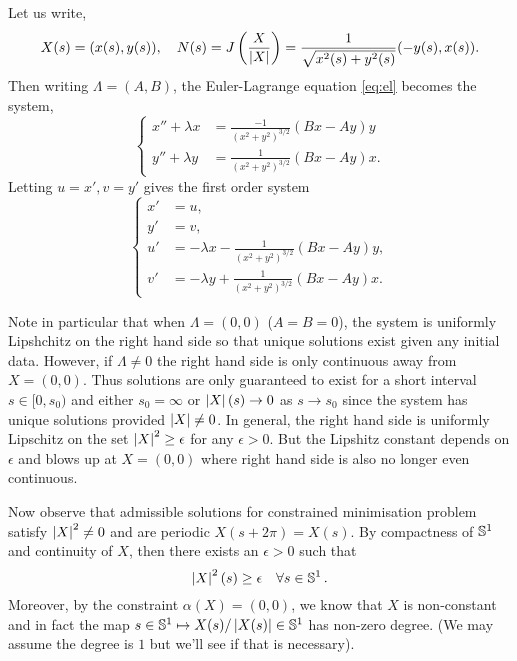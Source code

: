\documentclass[12pt]{article}
\begin{document}
Let us write,
\[
X(s) = (x(s), y(s)), \quad N(s) = J\left(\frac{X}{\left|{X}\right|}\right) = \frac{1}{\sqrt{x^2(s) + y^2(s)}} (-y(s), x(s)).
\]
Then writing \(\Lambda = (A, B)\), the Euler-Lagrange equation \eqref{eq:el} becomes the system,
\[
\begin{cases}
x'' + \lambda x &= \frac{-1}{(x^2 + y^2)^{3/2}} (Bx - Ay) y \\
y'' + \lambda y &= \frac{1}{(x^2 + y^2)^{3/2}} (Bx- Ay) x.
\end{cases}
\]
Letting \(u = x', v = y'\) gives the first order system
\begin{equation}
\label{eq:ode}
\begin{cases}
x' &= u, \\
y' &= v, \\
u' &= -\lambda x - \frac{1}{(x^2 + y^2)^{3/2}} (Bx - Ay) y, \\
v' &= -\lambda y + \frac{1}{(x^2 + y^2)^{3/2}} (Bx - Ay) x.
\end{cases}
\end{equation}

Note in particular that when \(\Lambda = (0, 0)\) (\(A = B = 0\)), the system is uniformly Lipshchitz on the right hand side so that unique solutions exist given any initial data. However, if \(\Lambda \ne 0\) the right hand side is only continuous away from \(X = (0, 0)\). Thus solutions are only guaranteed to exist for a short interval \(s \in [0, s_0)\) and either \(s_0 = \infty\) or \(\left|{X}\right|(s) \to 0\) as \(s \to s_0\) since the system has unique solutions provided \(\left|{X}\right| \ne 0\). In general, the right hand side is uniformly Lipschitz on the set \(\left|{X}\right|^2 \geq \epsilon\) for any \(\epsilon > 0\). But the Lipshitz constant depends on \(\epsilon\) and blows up at \(X = (0, 0)\) where right hand side is also no longer even continuous.

Now observe that admissible solutions for constrained minimisation problem satisfy \(\left|{X}\right|^2 \ne 0\) and are periodic \(X(s + 2\pi) = X(s)\). By compactness of \(\operatorname{\mathbb{S}^1}\) and continuity of \(X\), then there exists an \(\epsilon > 0\) such that
\begin{equation}
\label{eq:non_degen}
\left|{X}\right|^2(s) \geq \epsilon \quad \forall s \in \operatorname{\mathbb{S}^1}.
\end{equation}
Moreover, by the constraint \(\alpha(X) = (0, 0)\), we know that \(X\) is non-constant and in fact the map \(s \in \operatorname{\mathbb{S}^1} \mapsto X(s)/\left|{X(s)}\right| \in \operatorname{\mathbb{S}^1}\) has non-zero degree. ({\color{red}We may assume the degree is \(1\) but we'll see if that is necessary}).
\end{document}
